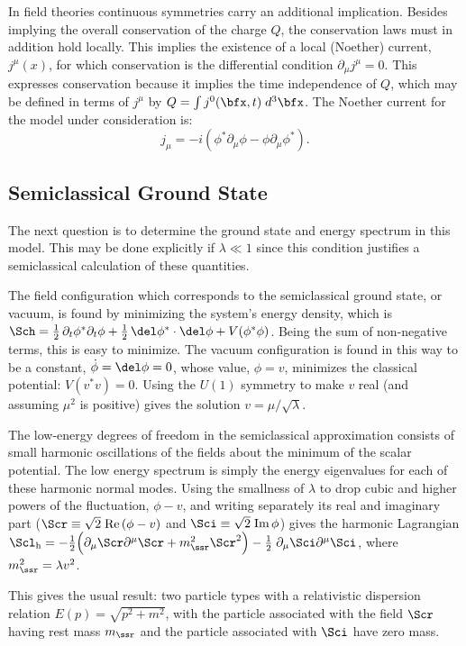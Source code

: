 \documentclass[12pt]{article}
\def\hf{{\frac12}}
\def\Re{{ \mbox{Re} \,}}
\def\Im{{ \mbox{Im} \,}}
\def\eq{\begin{equation}}
\def\eeq{\end{equation}}
\begin{document}
In field theories continuous symmetries carry an additional implication.
Besides implying the overall conservation of the charge $Q$, the
conservation laws must in addition hold locally. This implies 
the existence of a local (Noether) current, $j^\mu(x)$, 
for which conservation is the differential condition $\partial_\mu 
j^\mu = 0$. This expresses conservation because it implies the 
time independence of $Q$, which may be defined in terms of 
$j^\mu$ by $Q = \int j^0(\bfx,t) \; d^3\bfx$.
The Noether current for the model under consideration is:
%
\eq
\label{toync}
j_\mu = -i \left( \phi^* \partial_\mu \phi - \phi \partial_\mu \phi^* \right).
\eeq

\subsection{Semiclassical Ground State}

The next question is to determine the ground state and energy spectrum
in this model. This may be done explicitly if $\lambda \ll 1$ since
this condition justifies a semiclassical calculation of these quantities.

The field configuration which corresponds to the semiclassical 
ground state, or vacuum, is found by minimizing the system's 
energy density, which is $\Sch = \hf \, \partial_t{\phi}^* 
\partial_t{\phi} + \hf \, \del\phi^* \cdot \del\phi + V(\phi^*\phi)$. 
Being the sum of non-negative terms, this is easy to minimize. 
The vacuum configuration is found in this way to be a constant, 
$\dot\phi = \del\phi = 0$, whose value, $\phi = v$, minimizes the classical
potential: $V(v^*v) = 0$. Using the $U(1)$ symmetry to make 
$v$ real (and assuming $\mu^2$ is positive) gives the solution
$v = \mu /\sqrt{\lambda}$. 

The low-energy degrees of freedom in the semiclassical approximation 
consists of small harmonic oscillations of the fields about the minimum
of the scalar potential. The low energy spectrum is simply the
energy eigenvalues for each of these harmonic normal modes. 
Using the smallness of $\lambda$ to drop cubic and higher powers
of the fluctuation, $\phi - v$, and writing separately its real and 
imaginary part ($\Scr \equiv \sqrt{2} \; \Re (\phi - v)$ and 
$\Sci \equiv \sqrt{2} \; \Im \phi$) gives the harmonic 
Lagrangian $\Scl_{\rm h} =
-\hf \Bigl( \partial_\mu \Scr \partial^\mu \Scr + m_\ssr^2 \Scr^2 \Bigr)
-\hf  \; \partial_\mu \Sci \partial^\mu \Sci $, where $m_\ssr^2 
= \lambda v^2$. 

This gives the usual result: two particle types with a relativistic 
dispersion relation $E(p) = \sqrt{p^2 + m^2}$, with the particle
associated with the field $\Scr$ having rest mass $m_\ssr$ and
the particle associated with $\Sci$ have zero mass. 
\end{document}
